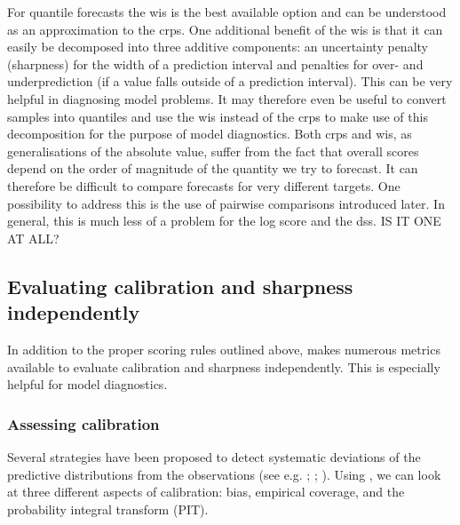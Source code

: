 \documentclass[article,shortnames]{jss}
\begin{document}
For quantile forecasts the wis is the best available option and can be understood as an approximation to the crps. One additional benefit of the wis is that it can easily be decomposed into three additive components: an uncertainty penalty (sharpness) for the width of a prediction interval and penalties for over- and underprediction (if a value falls outside of a prediction interval). This can be very helpful in diagnosing model problems. It may therefore even be useful to convert samples into quantiles and use the wis instead of the crps to make use of this decomposition for the purpose of model diagnostics. 
Both crps and wis, as generalisations of the absolute value, suffer from the fact that overall scores depend on the order of magnitude of the quantity we try to forecast. It can therefore be difficult to compare forecasts for very different targets. One possibility to address this is the use of pairwise comparisons introduced later. In general, this is much less of a problem for the log score and the dss. IS IT ONE AT ALL? 

\subsection{Evaluating calibration and sharpness independently}

In addition to the proper scoring rules outlined above,  makes numerous metrics available to evaluate calibration and sharpness independently. This is especially helpful for model diagnostics. 

\subsubsection{Assessing calibration} 

Several strategies have been proposed to detect systematic deviations of the predictive distributions from the observations (see e.g. \cite{funkAssessingPerformanceRealtime2019}; \cite{gneitingProbabilisticForecastsCalibration2007}; \cite{gneitingStrictlyProperScoring2007}). Using , we can look at three different aspects of calibration: bias, empirical coverage, and the probability integral transform (PIT). 
\end{document}
